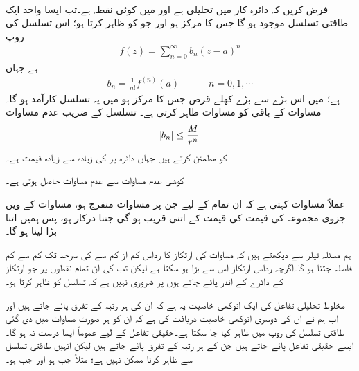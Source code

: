 \quad {}\\
فرض کریں کہ دائرہ کار  میں  تحلیلی ہے اور  میں  کوئی نقطہ ہے۔تب ایسا واحد ایک طاقتی تسلسل موجود ہو گا جس کا مرکز  ہو اور جو  کو ظاہر کرتا ہو؛ اس تسلسل کی روپ
\begin{align}\label{مساوات_ٹیلر_ٹیلر_تسلسل}
f(z)=\sum\limits_{n=0}^{\infty} b_n(z-a)^n
\end{align}
ہے جہاں
\begin{align*}
b_n=\frac{1}{n!}f^{(n)}(a)\quad \quad \quad n=0,1,\cdots
\end{align*}
ہے؛ میں اس بڑے سے بڑے کھلے قرص جس کا مرکز  ہو میں یہ تسلسل کارآمد ہو گا۔مساوات  کے باقی  کو  مساوات  ظاہر کرتی ہے۔ تسلسل کے  ضریب   عدم مساوات 
\begin{align}\label{مساوات_ٹیلر_ٹیلر_عددی_سر_عدم_مساوات}
\abs{b_n}\le \frac{M}{r^n}
\end{align}
کو مطمئن کرتے ہیں جہاں دائرہ  پر  کی زیادہ سے زیادہ قیمت  ہے۔ 

کوشی عدم مساوات  سے عدم مساوات   حاصل ہوتی ہے۔

عملاً مساوات  کہتی ہے کہ ان تمام  کے لیے جن پر مساوات  منفرج ہو، مساوات  کے  ویں جزوی مجموعہ کی قیمت  کی قیمت کے اتنی قریب ہو گی جتنا درکار ہو، پس ہمیں  اتنا بڑا لینا ہو گا۔

ہم مسئلہ ٹیلر سے دیکھتے ہیں کہ مساوات  کی ارتکاز کا رداس کم از کم  سے  کی سرحد تک کم سے کم فاصلہ جتنا ہو گا۔اگرچہ رداس  ارتکاز اس سے بڑا ہو سکتا ہے لیکن تب  کی ان تمام نقطوں پر جو ارتکاز کے دائرے کے اندر  پائے جاتے ہوں پر ضروری نہیں ہے کہ تسلسل  کو ظاہر کرتا ہو۔ 

مخلوط تحلیلی تفاعل کی ایک انوکھی خاصیت یہ ہے کہ ان کی ہر رتبہ کے تفرق پائے جاتے ہیں اور اب ہم نے ان کی دوسری انوکھی خاصیت دریافت کی ہے کہ ان کو ہر صورت مساوات  میں دی گئی طاقتی تسلسل کی روپ میں ظاہر کیا جا سکتا ہے۔حقیقی تفاعل کے لیے عموماً ایسا درست نہ ہو گا۔ایسے حقیقی تفاعل پائے جاتے ہیں جن کے ہر رتبہ کے تفرق پائے جاتے ہیں لیکن انہیں طاقتی تسلسل سے ظاہر کرنا ممکن نہیں ہے؛ مثلاً  جب  ہو اور  جب  ہو۔

